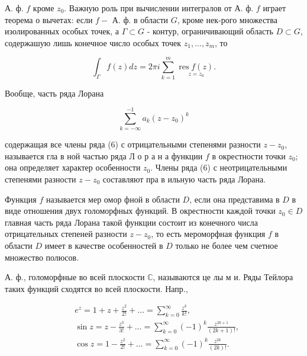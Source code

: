 \documentclass[10pt]{article}
\begin{document}
А. ф. $f$ кроме $z_{0}$. Важную роль при вычислении интегралов от А. ф. $f$ играет теорема о вычетах: если $f-$ А. ф. в области $G$, кроме нек-рого множества изолированных особых точек, а $\Gamma \subset G$ - контур, ограничивающий область $D \subset G$, содержашую лишь конечное число особых точек $z_{1}, \ldots, z_{m}$, то



\[

\int_{\Gamma} f(z) d z=2 \pi i \sum_{k=1}^{m} \underset{z=z_{0}}{\operatorname{res} f(z) .}

\]



Вообще, часть ряда Лорана



\[

\sum_{k=-\infty}^{-1} a_{k}\left(z-z_{0}\right)^{k}

\]



содержащая все члены ряда (6) с отрицательными степенями разности $z-z_{0}$, называется гла в ной частью ряда Л о р а н а функции $f$ в окрестности точки $z_{0}$; она определяет характер особенности $z_{0}$. Члены ряда (6) с неотрицательными степенями разности $z-z_{0}$ составляют пра в ильную часть ряда Лорана.



Функция $f$ называется мер омор фной в области $D$, если она представима в $D$ в виде отношения двух голоморфных функций. В окрестности каждой точки $z_{0} \in D$ главная часть ряда Лорана такой функции состоит из конечного числа отрицательных степеней разности $z-z_{0}$, то есть мероморфная функция $f$ в области $D$ имеет в качестве особенностей в $D$ только не более чем счетное множество полюсов.



А. ф., голоморфные во всей плоскости $\mathbb{C}$, называются це лы м и. Ряды Тейлора таких функций сходятся во всей плоскости. Напр.,



\[

\begin{aligned}

& e^{z}=1+z+\frac{z^{2}}{2 !}+\ldots=\sum_{k=0}^{\infty} \frac{z^{k}}{k !}, \\

& \sin z=z-\frac{z^{3}}{3 !}+\ldots=\sum_{k=0}^{\infty}(-1)^{k} \frac{z^{2 k+1}}{(2 k+1) !}, \\

& \cos z=1-\frac{z^{2}}{2 !}+\ldots=\sum_{k=0}^{\infty}(-1)^{k} \frac{z^{2 k}}{(2 k) !} .

\end{aligned}

\]
\end{document}
